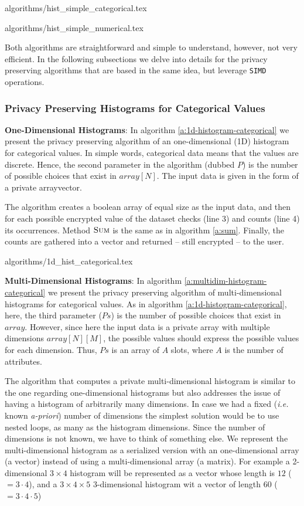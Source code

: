 {algorithms/hist_simple_categorical.tex}

{algorithms/hist_simple_numerical.tex}

Both algorithms are straightforward and simple to understand, however, not very efficient.
In the following subsections we delve into details for the privacy preserving algorithms that are based in the same idea, but leverage \texttt{SIMD} operations.


\subsubsection{Privacy Preserving Histograms for Categorical Values}\label{sss:histogram-categorical}
\textbf{One-Dimensional Histograms}: In algorithm \ref{a:1d-histogram-categorical} we present the privacy preserving algorithm of an one-dimensional (1D) histogram for categorical values.
In simple words, categorical data means that the values are discrete.
Hence, the second parameter in the algorithm (dubbed $P$) is the number of possible choices that exist in $array[N]$.
The input data is given in the form of a private array\myslash vector.

The algorithm creates a boolean array of equal size as the input data, and then for each possible encrypted value of the dataset checks (line 3) and counts (line 4) its occurrences.
Method { $\textsc{Sum}$} is the same as in algorithm \ref{a:sum}.
Finally, the counts are gathered into a vector and returned -- still encrypted -- to the user.

{algorithms/1d_hist_categorical.tex}



\textbf{Multi-Dimensional Histograms}: In algorithm \ref{a:multidim-histogram-categorical} we present the privacy preserving algorithm of multi-dimensional histograms for categorical values.
As in algorithm \ref{a:1d-histogram-categorical}, here, the third parameter ($Ps$) is the number of possible choices that exist in $array$.
However, since here the input data is a private array with multiple dimensions $array[N][M]$, the possible values should express the possible values for each dimension.
Thus, $Ps$ is an array of $A$ slots, where $A$ is the number of attributes.


The algorithm that computes a private multi-dimensional histogram is similar to the one regarding one-dimensional histograms but also addresses the issue of having a histogram of arbitrarily many dimensions.
In case we had a fixed (\textit{i.e.} known \textit{a-priori}) number of dimensions the simplest solution would be to use nested loops, as many as the histogram dimensions.
Since the number of dimensions is not known, we have to think of something else.
We represent the multi-dimensional histogram as a serialized version with an one-dimensional array (a vector) instead of using a multi-dimensional array (a matrix).
For example a 2-dimensional $3 \times 4$ histogram will be represented as a vector whose length is $ 12 $ ($= 3 \cdot 4$), and a $3 \times 4 \times 5$ 3-dimensional histogram wit a vector of length $ 60 $ ($= 3 \cdot 4 \cdot 5$)

